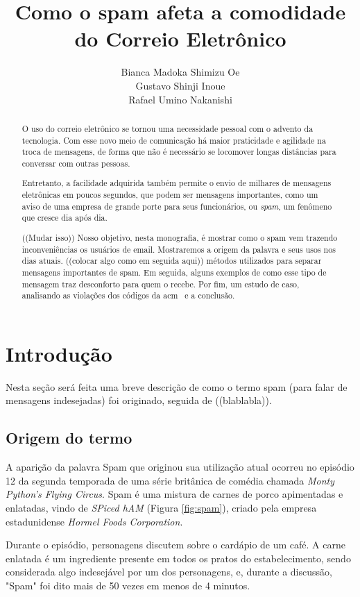 \documentclass[a4paper,dvipdfm]{article}
\title{Como o spam afeta a comodidade do Correio Eletrônico}
\author{Bianca Madoka Shimizu Oe\\
		Gustavo Shinji Inoue\\
		Rafael Umino Nakanishi}
\begin{document}
\maketitle

\begin{abstract}
	O uso do correio eletrônico se tornou uma necessidade pessoal com o advento da tecnologia. Com esse novo meio de comunicação há maior praticidade e agilidade na troca de mensagens, de forma que não é necessário se locomover longas distâncias para conversar com outras pessoas.

	Entretanto, a facilidade adquirida também permite o envio de milhares de mensagens eletrônicas em poucos segundos, que podem ser mensagens importantes, como um aviso de uma empresa de grande porte para seus funcionários, ou \emph{spam}, um fenômeno que cresce dia após dia.

	((Mudar isso))
	Nosso objetivo, nesta monografia, é mostrar como o spam vem trazendo inconveniências os usuários de \gls{email}.
	Mostraremos a origem da palavra e seus usos nos dias atuais. 
	((colocar algo como em seguida aqui)) métodos utilizados para separar mensagens importantes de spam.
	Em seguida, alguns exemplos de como esse tipo de mensagem traz desconforto para quem o recebe. 
	Por fim, um estudo de caso, analisando as violações dos códigos da \gls{acm}~\cite{ACM} e a conclusão.
\end{abstract}

\newpage

\tableofcontents
\newpage


\section{Introdução}
	Nesta seção será feita uma breve descrição de como o termo spam (para falar de mensagens indesejadas) foi originado, seguida de ((blablabla)).

	\subsection{Origem do termo}
		A aparição da palavra Spam que originou sua utilização atual ocorreu no episódio 12 da segunda temporada de uma série britânica de comédia chamada \emph{Monty Python's Flying Circus}. 
		Spam é uma mistura de carnes de porco apimentadas e enlatadas, vindo de \emph{SPiced hAM} (Figura \ref{fig:spam}), criado pela empresa estadunidense \emph{Hormel Foods Corporation}.

		Durante o episódio, personagens discutem sobre o cardápio de um café. 
		A carne enlatada é um ingrediente presente em todos os pratos do estabelecimento, sendo considerada algo indesejável por um dos personagens, e, durante a discussão, "Spam" foi dito mais de 50 vezes em menos de 4 minutos.
\end{document}
